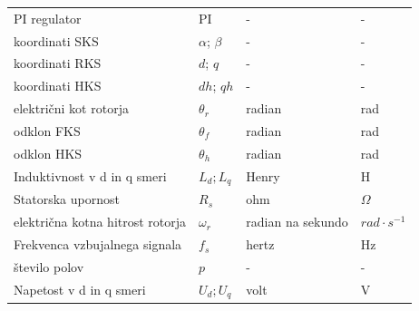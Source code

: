 \documentclass[a4paper,twoside,openright,12pt,slovene]{book}
\begin{document}
\begin{center}
\begin{tabular}{*{4}{l}}
        PI regulator                                               & PI                                     & -                    & -                      \\                                                    
        koordinati SKS                                             & $\alpha$; $\beta$                      & -                    & -                      \\
        koordinati RKS                                             & $d$; $q$                               & -                    & -                      \\
        koordinati HKS                                             & $dh$; $qh$                             & -                    & -                      \\
        električni kot rotorja                                     & $\theta_{r}$                           & radian               & rad                    \\
        odklon FKS                                                 & $\theta_{f}$                           & radian               & rad                    \\
        odklon HKS                                                 & $\theta_{h}$                           & radian               & rad                    \\
        Induktivnost v d in q smeri                                & $L_d; L_q$                             & Henry                & H                      \\
        Statorska upornost                                         & $R_s$                                  & ohm                  & $\Omega$               \\
        električna kotna hitrost rotorja                           & $\omega_r$                             & radian na sekundo    & $rad \cdot s^{-1}$     \\
        Frekvenca vzbujalnega signala                              & $f_{s}$                                & hertz                & Hz                     \\
        število polov                                              & $p$                                    & -                    & -                      \\
        Napetost v d in q smeri                                    & $U_{d}; U_{q}$                         & volt                 & V                      \\

\end{tabular}
\end{center}
\end{document}
